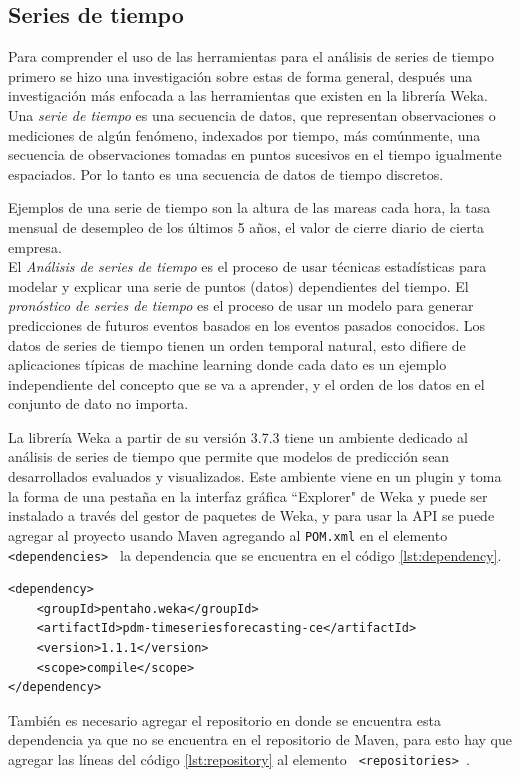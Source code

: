 \subsection{Series de tiempo} \label{subsec:estudiost}
Para comprender el uso de las herramientas para el análisis de series de tiempo primero se hizo una investigación sobre estas de forma general, después una investigación más enfocada a las herramientas que existen en la librería Weka.\\
Una \textit{serie de tiempo} es una secuencia de datos, que representan observaciones o
mediciones de algún fenómeno, indexados por tiempo, más comúnmente, una
secuencia de observaciones tomadas en puntos sucesivos en el tiempo igualmente
espaciados. Por lo tanto es una secuencia de datos de tiempo discretos. 

Ejemplos de una serie de tiempo son la altura de las mareas cada hora, la tasa mensual de
desempleo de los últimos 5 años, el valor de cierre diario de cierta empresa.\\
El \textit{Análisis de series de tiempo} es el proceso de usar técnicas estadísticas para modelar y explicar una serie de puntos (datos) dependientes del tiempo. El \textit{pronóstico de series de tiempo} es el proceso
de  usar un modelo para generar predicciones de futuros eventos basados en los eventos pasados conocidos.
Los datos de series de tiempo tienen un orden temporal natural, esto difiere de aplicaciones típicas de 
machine learning donde cada dato es un ejemplo independiente del concepto que se va a aprender, y el orden
de los datos en el conjunto de dato no importa. 

La librería Weka a partir de su versión 3.7.3 tiene un ambiente dedicado al análisis de series de tiempo que permite que modelos de predicción sean desarrollados evaluados y visualizados. Este ambiente viene en un plugin y toma la forma de una pestaña en la interfaz gráfica ``Explorer" de Weka y puede ser instalado a través del gestor de paquetes de Weka, y para usar la API se puede agregar al proyecto usando Maven agregando al \texttt{POM.xml} en el elemento {\tt \lstinline$ <dependencies>$ } la dependencia que se encuentra en el código \ref{lst:dependency}.
\begin{lstlisting}[frame=single]  
<dependency>
	<groupId>pentaho.weka</groupId>
	<artifactId>pdm-timeseriesforecasting-ce</artifactId>
	<version>1.1.1</version>
	<scope>compile</scope>
</dependency>
\end{lstlisting} 
También es necesario agregar el repositorio en donde se encuentra esta dependencia ya que no se encuentra en el repositorio de Maven, para esto hay que agregar las líneas del código \ref{lst:repository} al elemento  {\tt \lstinline$ <repositories>$ }. 

